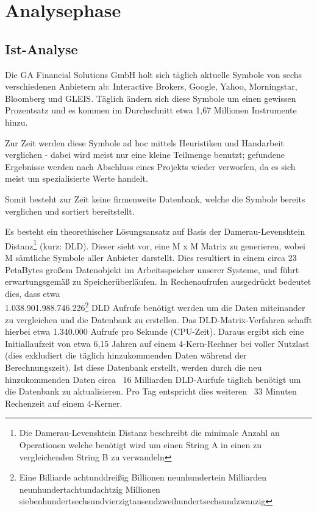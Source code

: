 \section{Analysephase}
\label{section:analysephase}
\subsection{Ist-Analyse}
Die GA Financial Solutions GmbH holt sich täglich aktuelle Symbole von sechs verschiedenen
Anbietern ab: Interactive Brokers, Google, Yahoo, Morningstar, Bloomberg und GLEIS.
Täglich ändern sich diese Symbole um einen gewissen Prozentsatz und es kommen im Durchschnitt etwa 1,67 Millionen Instrumente hinzu.\par

Zur Zeit werden diese Symbole ad hoc mittels Heuristiken und Handarbeit verglichen -
dabei wird meist nur eine kleine Teilmenge benutzt; gefundene Ergebnisse werden
nach Abschluss eines Projekts wieder verworfen, da es sich meist um spezialisierte Werte handelt.\par

Somit besteht zur Zeit keine firmenweite Datenbank, welche die Symbole
bereits verglichen und sortiert bereitstellt.\par

Es besteht ein theorethischer Lösungsansatz auf Basis der Damerau-Levenshtein Distanz\footnote{Die Damerau-Levenshtein Distanz\cite{dl_distance} beschreibt die minimale Anzahl
	an Operationen welche benötigt wird um einen String A in einen zu
	vergleichenden String B zu verwandeln} (kurz: DLD). Dieser sieht vor, eine M x M Matrix zu generieren, wobei M sämtliche Symbole aller
Anbieter darstellt. Dies resultiert in einem circa 23 PetaBytes großem Datenobjekt
im Arbeitsspeicher unserer Systeme, und führt erwartungsgemäß zu Speicherüberläufen.
In Rechenaufrufen ausgedrückt bedeutet dies, dass etwa \\
1.038.901.988.746.226\footnote{Eine Billiarde achtunddreißig Billionen neunhundertein Milliarden
	neunhundertachtundachtzig Millionen siebenhundertsechsundvierzigtausendzweihundertsechsundzwanzig} DLD Aufrufe benötigt werden um die Daten miteinander
zu vergleichen und die Datenbank zu erstellen. Das DLD-Matrix-Verfahren schafft hierbei 
etwa 1.340.000 Aufrufe pro Sekunde (CPU-Zeit).
Daraus ergibt sich eine Initiallaufzeit von etwa 6,15 Jahren auf einem 4-Kern-Rechner bei voller Nutzlast (dies exkludiert die täglich hinzukommenden Daten
während der Berechnungszeit). Ist diese Datenbank erstellt, werden durch die neu
hinzukommenden Daten circa ~16 Milliarden DLD-Aurfufe täglich benötigt um die
Datenbank zu aktualisieren. Pro Tag entspricht dies weiteren ~33 Minuten Rechenzeit auf
einem 4-Kerner.\par

